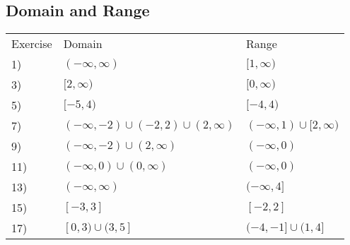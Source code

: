 \documentclass[12pt]{book}
\theoremstyle{definition}
\begin{document}
\subsection*{Domain and Range}

\begin{tabular}{lll}
Exercise & Domain & Range\\
1) & $(-\infty,\infty)$ & $[1,\infty)$\\
3) & $[2,\infty)$ & $[0,\infty)$\\
5) & $[-5,4)$ & $[-4,4)$\\
7) & $(-\infty,-2)\cup(-2,2)\cup(2,\infty)$ & $(-\infty,1)\cup[2,\infty)$\\
9) & $(-\infty,-2)\cup(2,\infty)$ & $(-\infty,0)$\\
11) & $(-\infty,0)\cup(0,\infty)$ & $(-\infty,0)$\\
13) & $(-\infty,\infty)$ & $(-\infty,4]$\\
15) & $[-3,3]$ & $[-2,2]$\\
17) & $[0,3)\cup(3,5]$ & $(-4,-1]\cup(1,4]$\\
\end{tabular}
\end{document}
